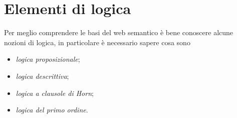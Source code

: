 \documentclass[tesi.tex]{subfile}
\begin{document}
\chapter{Elementi di logica}
Per meglio comprendere le basi del web semantico \`e bene conoscere
alcune nozioni di logica, in particolare \`e necessario sapere cosa
sono
\begin{itemize}
\item \emph{logica proposizionale};
\item \emph{logica descrittiva};
\item \emph{logica a clausole di Horn};
\item \emph{logica del primo ordine}.
\end{itemize}
\end{document}
